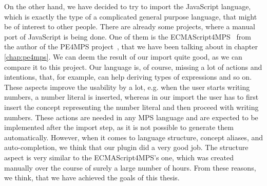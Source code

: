 On the other hand, we have decided to try to import the JavaScript language, which is exactly the type of a complicated general purpose language, that might be of interest to other people.
There are already some projects, where a manual port of JavaScript is being done.
One of them is the ECMAScript4MPS~\cite{ECMAScript4MPS} from the author of the PE4MPS project~\cite{PE4MPS}, that we have been talking about in chapter \ref{chap:pe4mps}.
We can deem the result of our import quite good, as we can compare it to this project.
Our language is, of course, missing a lot of actions and intentions, that, for example, can help deriving types of expressions and so on.
These aspects improve the usability by a lot, e.g. when the user starts writing numbers, a number literal is inserted, whereas in our import the user has to first insert the concept representing the number literal and then proceed with writing numbers.
These actions are needed in any MPS language and are expected to be implemented after the import step, as it is not possible to generate them automatically.
However, when it comes to language structure, concept aliases, and auto-completion, we think that our plugin did a very good job.
The structure aspect is very similar to the ECMAScript4MPS's one, which was created manually over the course of surely a large number of hours.
From these reasons, we think, that we have achieved the goals of this thesis.
